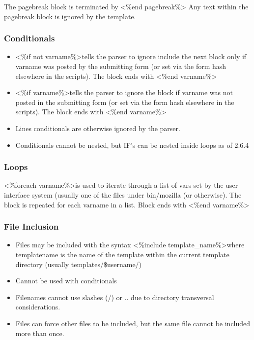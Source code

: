 \documentclass{article}
\begin{document}
The pagebreak block is terminated by \textless\%end pagebreak\%\textgreater 
Any text within the pagebreak block is ignored by the template.

\subsubsection{Conditionals}
\begin{itemize}
\item  \textless\%if not varname\%\textgreater tells the parser to ignore 
  include the next block only if varname was posted by the submitting form 
  (or set via the form hash elsewhere in the scripts). The block ends with
  \textless\%end varname\%\textgreater
\item \textless\%if varname\%\textgreater tells the parser to ignore the 
  block if varname was not posted in the submitting form (or set via the form 
  hash elsewhere in the scripts). The block ends with \textless\%end
  varname\%\textgreater
\item Lines conditionals are otherwise ignored by the parser.
\item Conditionals cannot be nested, but IF's can be nested inside loops as of
  2.6.4
\end{itemize}

\subsubsection{Loops}
\textless\%foreach varname\%\textgreater is used to iterate through a list of 
vars set by the user interface system (usually one of the files under 
bin/mozilla (or otherwise). The block is repeated for each varname in a list. 
Block ends with \textless\%end varname\%\textgreater

\subsubsection{File Inclusion}
\begin{itemize}
\item  Files may be included with the syntax \textless\%include
	template\_name\%\textgreater where templatename is the name of the 
	template within the current template directory (usually 
	templates/\$username/)
\item Cannot be used with conditionals
\item Filenames cannot use slashes (/) or .. due to directory transversal
	considerations.
\item Files can force other files to be included, but the same file cannot be
	included more than once. 
\end{itemize}
\end{document}
